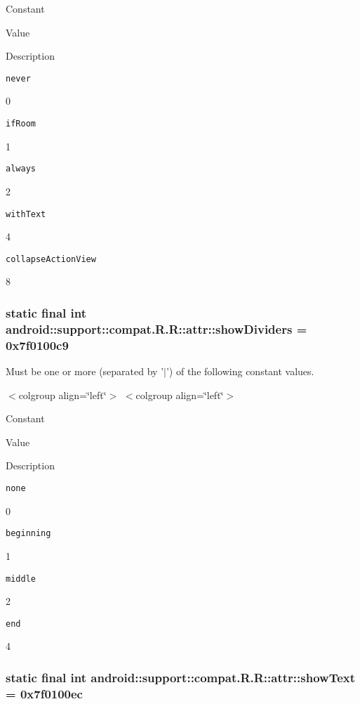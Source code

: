 Constant

Value

Description 

{\tt never}

0

{\tt ifRoom}

1

{\tt always}

2

{\tt withText}

4

{\tt collapseActionView}

8\hypertarget{classandroid_1_1support_1_1compat_1_1_r_1_1attr_796ffd9f9b0e7f9554517462a7388b4c}{
\subsubsection[{showDividers}]{\setlength{\rightskip}{0pt plus 5cm}static final int android::support::compat.R.R::attr::showDividers = 0x7f0100c9}}
\label{classandroid_1_1support_1_1compat_1_1_r_1_1attr_796ffd9f9b0e7f9554517462a7388b4c}


Must be one or more (separated by '$|$') of the following constant values. \begin{TabularC}{0}
\hline
\end{TabularC}
$<$colgroup align=\char`\"{}left\char`\"{}$>$ $<$colgroup align=\char`\"{}left\char`\"{}$>$ 

Constant

Value

Description 

{\tt none}

0

{\tt beginning}

1

{\tt middle}

2

{\tt end}

4\hypertarget{classandroid_1_1support_1_1compat_1_1_r_1_1attr_26b8608475a0cb47b0cc448d041138a0}{
\subsubsection[{showText}]{\setlength{\rightskip}{0pt plus 5cm}static final int android::support::compat.R.R::attr::showText = 0x7f0100ec}}
\label{classandroid_1_1support_1_1compat_1_1_r_1_1attr_26b8608475a0cb47b0cc448d041138a0}


